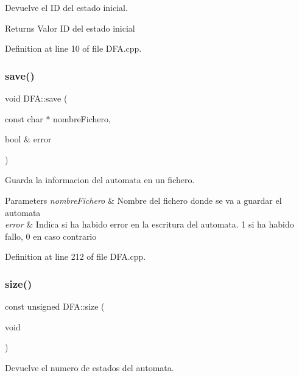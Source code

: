 Devuelve el ID del estado inicial. 

\begin{DoxyReturn}{Returns}
Valor ID del estado inicial 
\end{DoxyReturn}


Definition at line 10 of file D\+F\+A.\+cpp.

\mbox{\label{class_d_f_a_ac614efadfde86fde0b0ab45f2c9c2e5e}} 
\subsubsection{\texorpdfstring{save()}{save()}}
{\footnotesize\ttfamily void D\+F\+A\+::save (\begin{DoxyParamCaption}\item[{const char $\ast$}]{nombre\+Fichero,  }\item[{bool \&}]{error }\end{DoxyParamCaption})}



Guarda la informacion del automata en un fichero. 


\begin{DoxyParams}{Parameters}
{\em nombre\+Fichero} & Nombre del fichero donde se va a guardar el automata \\
\hline
{\em error} & Indica si ha habido error en la escritura del automata. 1 si ha habido fallo, 0 en caso contrario \\
\hline
\end{DoxyParams}


Definition at line 212 of file D\+F\+A.\+cpp.

\mbox{\label{class_d_f_a_a60333433beecab40b2e6eb8874de8524}} 
\subsubsection{\texorpdfstring{size()}{size()}}
{\footnotesize\ttfamily const unsigned D\+F\+A\+::size (\begin{DoxyParamCaption}\item[{void}]{ }\end{DoxyParamCaption})}



Devuelve el numero de estados del automata. 

